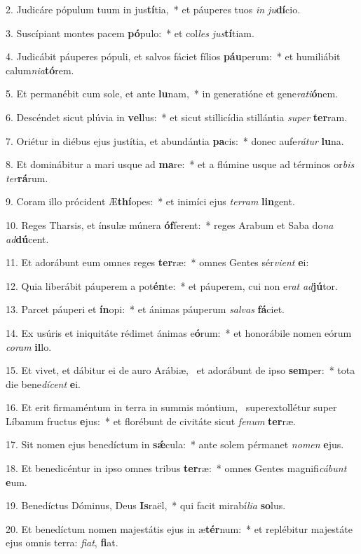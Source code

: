 2. Judicáre pópulum tuum in jus\textbf{tí}tia,~*  et páuperes tuos \textit{in} \textit{ju}\textbf{dí}cio.\

3. Suscípiant montes pacem \textbf{pó}pulo:~*  et col\textit{les} \textit{jus}\textbf{tí}tiam.\

4. Judicábit páuperes pópuli, et salvos fáciet fílios \textbf{páu}perum:~*  et humiliábit calum\textit{ni}\textit{a}\textbf{tó}rem.\

5. Et permanébit cum sole, et ante \textbf{lu}nam,~*  in generatióne et gene\textit{ra}\textit{ti}\textbf{ó}nem.\

6. Descéndet sicut plúvia in \textbf{vel}lus:~*  et sicut stillicídia stillántia \textit{su}\textit{per} \textbf{ter}ram.\

7. Oriétur in diébus ejus justítia, et abundántia \textbf{pa}cis:~*  donec aufe\textit{rá}\textit{tur} \textbf{lu}na.\

8. Et dominábitur a mari usque ad \textbf{ma}re:~*  et a flúmine usque ad términos or\textit{bis} \textit{ter}\textbf{rá}rum.\

9. Coram illo prócident Æ\textbf{thí}opes:~*  et inimíci ejus \textit{ter}\textit{ram} \textbf{lin}gent.\

10. Reges Tharsis, et ínsulæ múnera \textbf{óf}ferent:~*  reges Arabum et Saba do\textit{na} \textit{ad}\textbf{dú}cent.\

11. Et adorábunt eum omnes reges \textbf{ter}ræ:~*  omnes Gentes sér\textit{vi}\textit{ent} \textbf{e}i:\

12. Quia liberábit páuperem a pot\textbf{én}te:~*  et páuperem, cui non e\textit{rat} \textit{ad}\textbf{jú}tor.\

13. Parcet páuperi et \textbf{ín}opi:~*  et ánimas páuperum \textit{sal}\textit{vas} \textbf{fá}ciet.\

14. Ex usúris et iniquitáte rédimet ánimas e\textbf{ó}rum:~*  et honorábile nomen eórum \textit{co}\textit{ram} \textbf{il}lo.\

15. Et vivet, et dábitur ei de auro Arábiæ, \dag\  et adorábunt de ipso \textbf{sem}per:~*  tota die bene\textit{dí}\textit{cent} \textbf{e}i.\

16. Et erit firmaméntum in terra in summis móntium, \dag\  superextollétur super Líbanum fructus \textbf{e}jus:~*  et florébunt de civitáte sicut \textit{fe}\textit{num} \textbf{ter}ræ.\

17. Sit nomen ejus benedíctum in \textbf{sǽ}cula:~*  ante solem pérmanet \textit{no}\textit{men} \textbf{e}jus.\

18. Et benedicéntur in ipso omnes tribus \textbf{ter}ræ:~*  omnes Gentes magnifi\textit{cá}\textit{bunt} \textbf{e}um.\

19. Benedíctus Dóminus, Deus \textbf{Is}raël,~*  qui facit mirabí\textit{li}\textit{a} \textbf{so}lus.\

20. Et benedíctum nomen majestátis ejus in æ\textbf{tér}num:~*  et replébitur majestáte ejus omnis terra: \textit{fi}\textit{at}, \textbf{fi}at.\

